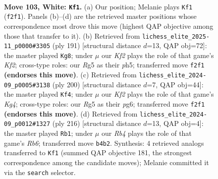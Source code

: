 \documentclass[11pt]{article}
\begin{document}
\clearpage

\begin{figure}[p]\centering
\begin{subfigure}{0.46\textwidth}\centering
\resizebox{\linewidth}{!}{%
\newchessgame
\chessboard[
  setfen={8/3k4/4p3/6R1/1R2P3/5P2/r4K2/8 w - - 9 103},
  showmover=false,
  pgfstyle=straightmove, color=movearrow, markmove={f2-f1}
]}
\caption{}
\end{subfigure}\hfill
\begin{subfigure}{0.46\textwidth}\centering
\resizebox{\linewidth}{!}{%
\newchessgame
\chessboard[
  setfen={8/R4kp1/7p/7P/6P1/1r6/5K2/8 b - - 48 96},
  showmover=false,
  pgfstyle=straightmove, color=movearrow, markmove={f7-g8}
]}
\caption{}
\end{subfigure}
\\[4pt]
\begin{subfigure}{0.46\textwidth}\centering
\resizebox{\linewidth}{!}{%
\newchessgame
\chessboard[
  setfen={8/7R/6pP/3k2P1/4p1K1/8/8/6r1 w - - 1 101},
  showmover=false,
  pgfstyle=straightmove, color=movearrow, markmove={g4-f4}
]}
\caption{}
\end{subfigure}\hfill
\begin{subfigure}{0.46\textwidth}\centering
\resizebox{\linewidth}{!}{%
\newchessgame
\chessboard[
  setfen={8/8/1R6/7k/6p1/6P1/3r1PK1/8 w - - 0 109},
  showmover=false,
  pgfstyle=straightmove, color=movearrow, markmove={b6-b1}
]}
\caption{}
\end{subfigure}
\caption{\textbf{Move 103, White: \texttt{Kf1}.} (a) Our position; Melanie plays \texttt{Kf1} (\texttt{f2f1}). Panels (b)--(d) are the retrieved master positions whose correspondence most drove this move (highest QAP objective among those that transfer to it). (b) Retrieved from \texttt{lichess\_elite\_2025-11\_p0000\#3305} (ply 191) [structural distance $d$=13, QAP obj=72]: the master played \texttt{Kg8}; under $\mu$ our \emph{Kf2} plays the role of that game's \emph{Kf2}; cross-type roles: our \emph{R}g5 as their \emph{p}h5; transferred move \texttt{f2f1} \textbf{(endorses this move)}. (c) Retrieved from \texttt{lichess\_elite\_2024-09\_p0005\#3138} (ply 200) [structural distance $d$=7, QAP obj=44]: the master played \texttt{Kf4}; under $\mu$ our \emph{Kf2} plays the role of that game's \emph{Kg4}; cross-type roles: our \emph{R}g5 as their \emph{p}g6; transferred move \texttt{f2f1} \textbf{(endorses this move)}. (d) Retrieved from \texttt{lichess\_elite\_2024-09\_p0012\#1327} (ply 216) [structural distance $d$=13, QAP obj=4]: the master played \texttt{Rb1}; under $\mu$ our \emph{Rb4} plays the role of that game's \emph{Rb6}; transferred move \texttt{b4b2}. Synthesis: 4 retrieved analogs transferred to \texttt{Kf1} (summed QAP objective 181, the strongest correspondence among the candidate moves); Melanie committed it via the \texttt{search} selector.}
\label{fig:thought-m204}
\end{figure}
\end{document}
